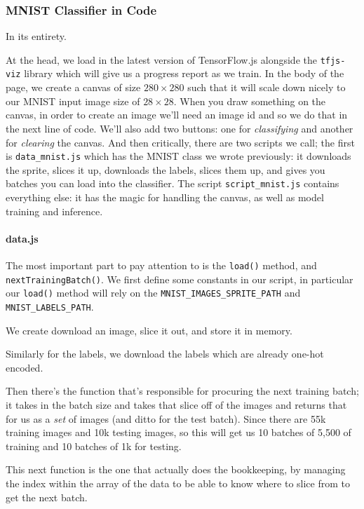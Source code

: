 \documentclass[12pt]{article}
\begin{document}
\subsubsection{MNIST Classifier in Code} In its entirety.

At the head, we load in the latest version of TensorFlow.js alongside the \texttt{tfjs-viz} library which will give us a progress report as we train. In the body of the page, we create a canvas of size $280 \times 280$ such that it will scale down nicely to our MNIST input image size of $28 \times 28$. When you draw something on the canvas, in order to create an image we'll need an image id and so we do that in the next line of code. We'll also add two buttons: one for \emph{classifying} and another for \emph{clearing} the canvas. And then critically, there are two scripts we call; the first is \texttt{data\_mnist.js} which has the MNIST class we wrote previously: it downloads the sprite, slices it up, downloads the labels, slices them up, and gives you batches you can load into the classifier. The script \texttt{script\_mnist.js} contains everything else: it has the magic for handling the canvas, as well as model training and inference.

\paragraph{data.js}
The most important part to pay attention to is the \texttt{load()} method, and \texttt{nextTrainingBatch()}. We first define some constants in our script, in particular our \texttt{load()} method will rely on the \texttt{MNIST\_IMAGES\_SPRITE\_PATH} and \texttt{MNIST\_LABELS\_PATH}.

We create download an image, slice it out, and store it in memory.

Similarly for the labels, we download the labels which are already one-hot encoded.

Then there's the function that's responsible for procuring the next training batch; it takes in the batch size and takes that slice off of the images and returns that for us as a \emph{set} of images (and ditto for the test batch). Since there are 55k training images and 10k testing images, so this will get us 10 batches of 5,500 of training and 10 batches of 1k for testing. 

This next function is the one that actually does the bookkeeping, by managing the index within the array of the data to be able to know where to slice from to get the next batch.

\end{document}
